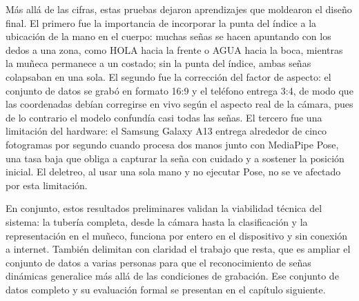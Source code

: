 Más allá de las cifras, estas pruebas dejaron aprendizajes que moldearon el diseño final. El
primero fue la importancia de incorporar la punta del índice a la ubicación de la mano en el
cuerpo: muchas señas se hacen apuntando con los dedos a una zona, como HOLA hacia la frente o
AGUA hacia la boca, mientras la muñeca permanece a un costado; sin la punta del índice, ambas
señas colapsaban en una sola. El segundo fue la corrección del factor de aspecto: el conjunto
de datos se grabó en formato 16:9 y el teléfono entrega 3:4, de modo que las coordenadas debían
corregirse en vivo según el aspecto real de la cámara, pues de lo contrario el modelo confundía
casi todas las señas. El tercero fue una limitación del hardware: el Samsung Galaxy A13 entrega
alrededor de cinco fotogramas por segundo cuando procesa dos manos junto con MediaPipe Pose, una
tasa baja que obliga a capturar la seña con cuidado y a sostener la posición inicial. El
deletreo, al usar una sola mano y no ejecutar Pose, no se ve afectado por esta limitación.

En conjunto, estos resultados preliminares validan la viabilidad técnica del sistema: la
tubería completa, desde la cámara hasta la clasificación y la representación en el muñeco,
funciona por entero en el dispositivo y sin conexión a internet. También delimitan con claridad
el trabajo que resta, que es ampliar el conjunto de datos a varias personas para que el
reconocimiento de señas dinámicas generalice más allá de las condiciones de grabación. Ese
conjunto de datos completo y su evaluación formal se presentan en el capítulo siguiente.
